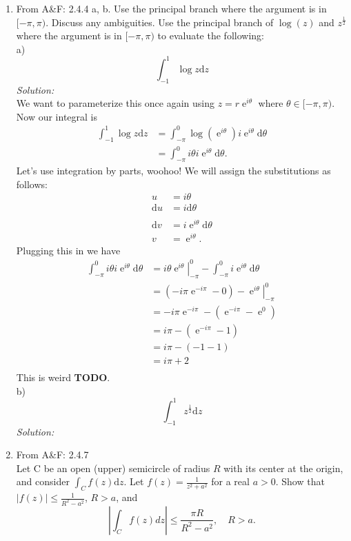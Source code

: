 \documentclass[10pt]{amsart}
\newcommand{\D}{\mathrm{d}}
\DeclareMathOperator{\E}{e}
\theoremstyle{nonumberplain}
\begin{document}
\begin{enumerate}[label={\bf {\arabic*}:}]
\item From A\&F: 2.4.4 a, b.
Use the principal branch where the argument is in $[-\pi,\pi)$.
Discuss any ambiguities. 
Use the principal branch of $\log(z)$ and $z^{\frac{1}{2}}$ where the argument is in $[-\pi,\pi)$ to evaluate the following: \\
a) $$\int_{-1}^{1}\log z \D z$$
\textit{Solution:} \\
We want to parameterize this once again using $z = r\E^{i\theta}$ where $\theta \in [-\pi,\pi)$. Now our integral is
\begin{align*}
\int_{-1}^{1}\log z \D z &= \int_{-\pi}^{0}\log \left(\E^{i\theta}\right) i \E^{i\theta} \D \theta \\
	&= \int_{-\pi}^{0} i\theta i \E^{i\theta} \D \theta.
\end{align*}
Let's use integration by parts, woohoo! We will assign the substitutions as follows:
\begin{align*}
u &= i\theta \\
\D u &= i \D \theta\\
\\
\D v &= i\E^{i \theta} \D \theta \\
v &= \E^{i \theta}.
\end{align*}
Plugging this in we have
\begin{align*}
\int_{-\pi}^{0} i\theta i \E^{i\theta} \D \theta &= \left. i\theta \E^{i\theta}\right|_{-\pi}^0 - \int_{-\pi}^0 i \E^{i \theta} \D \theta \\
	&= \left(-i\pi \E^{-i\pi} - 0 \right) - \left. \E^{i\theta}\right|_{-\pi}^0 \\
	&= -i\pi \E^{-i\pi} - \left(\E^{-i\pi} - \E^{0} \right) \\
	&= i\pi - \left(\E^{-i\pi} - 1 \right) \\
	&= i\pi - \left(-1 - 1 \right) \\
	&= i\pi + 2 \\
\end{align*}
This is weird \textbf{TODO}.
\\
b) $$\int_{-1}^{1}z^{\frac{1}{2}} \D z$$
\textit{Solution:} \\
\item From A\&F: 2.4.7 \\
Let C be an open (upper) semicircle of radius $R$ with its center at the origin, and consider $\int_C f(z) \D z$.
 Let $f(z) = \frac{1}{z^2 + a^2}$ for a real $a > 0$.
Show that $\left| f(z) \right| \leq \frac{1}{R^2 - a^2}$, $R > a$, and
$$
\left| \int_C f(z) dz \right| \leq \frac{\pi R}{R^2 - a^2}, \quad R > a.
$$
\end{enumerate}
\end{document}
